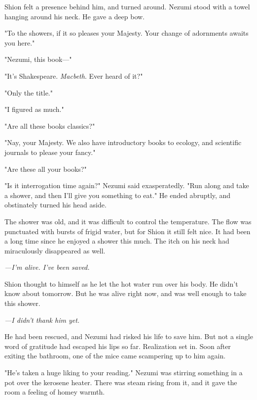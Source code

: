 
Shion felt a presence behind him, and turned around. Nezumi stood with a
towel hanging around his neck. He gave a deep bow.

"To the showers, if it so pleases your Majesty. Your change of
adornments awaits you here."

"Nezumi, this book---"

"It's Shakespeare. \emph{Macbeth}. Ever heard of it?"

"Only the title."

"I figured as much."

"Are all these books classics?"

"Nay, your Majesty. We also have introductory books to ecology, and
scientific journals to please your fancy."

"Are these all your books?"

"Is it interrogation time again?" Nezumi said exasperatedly. "Run along
and take a shower, and then I'll give you something to eat." He ended
abruptly, and obstinately turned his head aside.

\mybreak

The shower was old, and it was difficult to control the temperature. The
flow was punctuated with bursts of frigid water, but for Shion it still
felt nice. It had been a long time since he enjoyed a shower this much.
The itch on his neck had miraculously disappeared as well.

\emph{---I'm alive. I've been saved.}

Shion thought to himself as he let the hot water run over his body. He
didn't know about tomorrow. But he was alive right now, and was well
enough to take this shower.

\emph{---I didn't thank him yet.}

He had been rescued, and Nezumi had risked his life to save him. But not
a single word of gratitude had escaped his lips so far. Realization set
in. Soon after exiting the bathroom, one of the mice came scampering up
to him again.

"He's taken a huge liking to your reading." Nezumi was stirring
something in a pot over the kerosene heater. There was steam rising from
it, and it gave the room a feeling of homey warmth.

